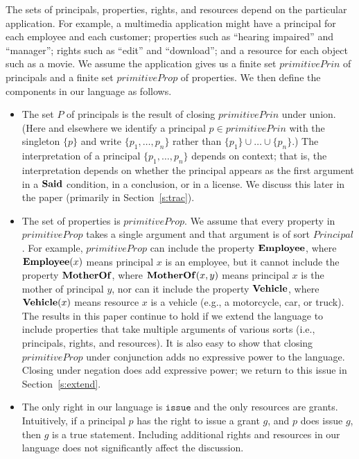 \documentclass{acmtrans2m}
\newcommand{\<}{
}
\renewcommand{\>}{\rangle}
\newcommand{\union}{\cup}
\newcommand{\Said}{\mathit{\bf Said}}
\newcommand{\issue}{\mathtt{issue}}
\newcommand{\primitiveProp}{\mathit{primitiveProp}}
\newcommand{\primitivePrinc}{\mathit{primitivePrin}}
\newcommand{\Princ}{\mathit{Principal}}
\begin{document}
The sets of principals, properties, rights, and resources depend on the particular application.
For example, a multimedia application might have a principal for each employee and each
customer; properties such as ``hearing impaired'' and ``manager''; rights such as ``edit'' and
``download''; and a resource for each object such as a movie.  We assume the application gives us
a finite set $\primitivePrinc$ of principals and a finite set $\primitiveProp$ of properties.  We
then define the components in our language as follows.
\begin{itemize}
\item The set $P$ of principals is the result of closing $\primitivePrinc$ under union.  (Here and
elsewhere we identify a principal $p\in \primitivePrinc$ with the singleton $\{p\}$ and write
$\{p_1, \ldots, p_n\}$ rather than $\{p_1\}\union\ldots\union \{p_n\}$.)  The interpretation of a
principal $\{p_1,\ldots, p_n\}$ depends on context; that is, the interpretation depends on whether
the principal appears as the first argument in a $\Said$ condition, in a conclusion, or in a
license.  We discuss this later in the paper (primarily in Section~\ref{s:trac}).
\item The set of properties is $\primitiveProp$.
We assume that
every property in $\primitiveProp$
takes a single argument and that argument is of sort $\Princ$.  For example, $\primitiveProp$ can
include the property $\mathit{\bf Employee}$, where $\mathit{\bf Employee}(x)$ means principal $x$
is an employee, but it cannot include the property $\mathit{\bf MotherOf}$, where
$\mathit{\bf MotherOf}(x, y)$ means principal $x$ is the mother of principal $y$, nor can it include
the property $\mathit{\bf Vehicle}$, where $\mathit{\bf Vehicle}(x)$ means resource $x$ is a vehicle
(e.g., a motorcycle, car, or truck).  The results in this paper continue to hold if we extend the
language to include properties that take multiple arguments of various sorts (i.e., principals,
rights, and resources).  It is also easy to show that closing $\primitiveProp$ under conjunction adds
no expressive power to the language.  Closing under negation does add expressive power; we return to
this issue in Section~\ref{s:extend}.
\item The only right in our language is $\issue$ and the only resources are grants.  Intuitively, if
a principal $p$ has the right to issue a grant $g$, and $p$ does issue $g$, then $g$ is a true
statement.  Including additional rights and resources in our language does not significantly affect
the discussion.
\end{itemize}
\end{document}
